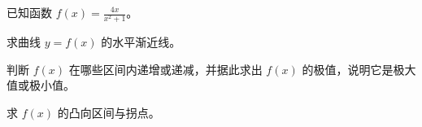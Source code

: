 \documentclass[12pt,a4paper]{exam-zh}
\newcommand{\qscoreoffset}{4em}
\newcommand{\qscore}[1]{%
    \leavevmode\unskip\nobreak\hfill
    \makebox[0pt][l]{\makebox[\qscoreoffset][r]{(#1\%)}}%
}
\begin{document}
\begin{question}[points = 10]
    已知函数 $\displaystyle f(x) = \frac{4x}{x^2+1}$。

    \begin{questionparts}
        \item 求曲线 $y = f(x)$ 的水平渐近线。 \qscore{2}

        \item 判断 $f(x)$ 在哪些区间内递增或递减，并据此求出 $f(x)$ 的极值，说明它是极大值或极小值。 \qscore{4}

        \item 求 $f(x)$ 的凸向区间与拐点。 \qscore{4}
    \end{questionparts}
\end{question}
\end{document}
